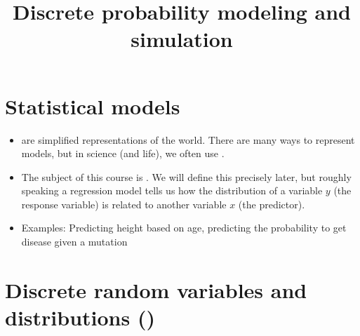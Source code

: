 




\title{Discrete probability modeling and simulation}
\maketitle


\section{Statistical models}

\begin{itemize}
\item {} are simplified representations of the world.
There are many ways to represent models, but in science (and life), we often use . 
\item The subject of this course is . We will define this precisely  later, but roughly speaking a regression model tells us how the distribution of a variable $y$ (the response variable) is related to another variable $x$ (the predictor). 
\item Examples: Predicting height based on age, predicting the probability to get disease given a mutation
\end{itemize}


\section{Discrete random variables and distributions (\cite[Ch. 1 Sec. 2]{tabak})}

